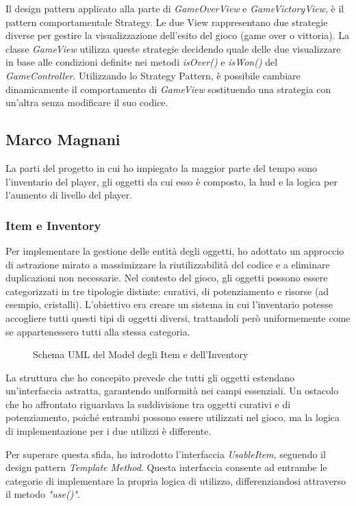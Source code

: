 \documentclass[a4paper,12pt]{report}
\begin{document}
Il design pattern applicato alla parte di \textit{GameOverView} e \textit{GameVictoryView}, è il pattern comportamentale Strategy. Le due View rappresentano due strategie diverse per gestire la visualizzazione dell'esito del gioco (game over o vittoria). La classe \textit{GameView} utilizza queste strategie decidendo quale delle due visualizzare in base alle condizioni definite nei metodi \textit{isOver()} e \textit{isWon()} del \textit{GameController}. Utilizzando lo Strategy Pattern, è possibile cambiare dinamicamente il comportamento di \textit{GameView} sostituendo una strategia con un'altra senza modificare il suo codice.

\subsection*{Marco Magnani}
La parti del progetto in cui ho impiegato la maggior parte del tempo sono l'inventario del player, gli oggetti da cui esso è composto, la hud e la logica per l'aumento di livello del player.

\subsubsection{Item e Inventory}

Per implementare la gestione delle entità degli oggetti, ho adottato un approccio di astrazione mirato a massimizzare la riutilizzabilità del codice e a eliminare duplicazioni non necessarie. Nel contesto del gioco, gli oggetti possono essere categorizzati in tre tipologie distinte: curativi, di potenziamento e risorse (ad esempio, cristalli).
L'obiettivo era creare un sistema in cui l'inventario potesse accogliere tutti questi tipi di oggetti diversi, trattandoli però uniformemente come se appartenessero tutti alla stessa categoria.
\begin{figure}[H]
	\centering
	
	\caption{Schema UML del Model degli Item e dell'Inventory}
	\label{fig:the-exiled-item-uml}
\end{figure}

La struttura che ho concepito prevede che tutti gli oggetti estendano un'interfaccia astratta, garantendo uniformità nei campi essenziali. Un ostacolo che ho affrontato riguardava la suddivisione tra oggetti curativi e di potenziamento, poiché entrambi possono essere utilizzati nel gioco, ma la logica di implementazione per i due utilizzi è differente.

Per superare questa sfida, ho introdotto l'interfaccia \textit{UsableItem}, seguendo il design pattern \textit{Template Method}. Questa interfaccia consente ad entrambe le categorie di implementare la propria logica di utilizzo, differenziandosi attraverso il metodo \textit{"use()"}.
\end{document}
